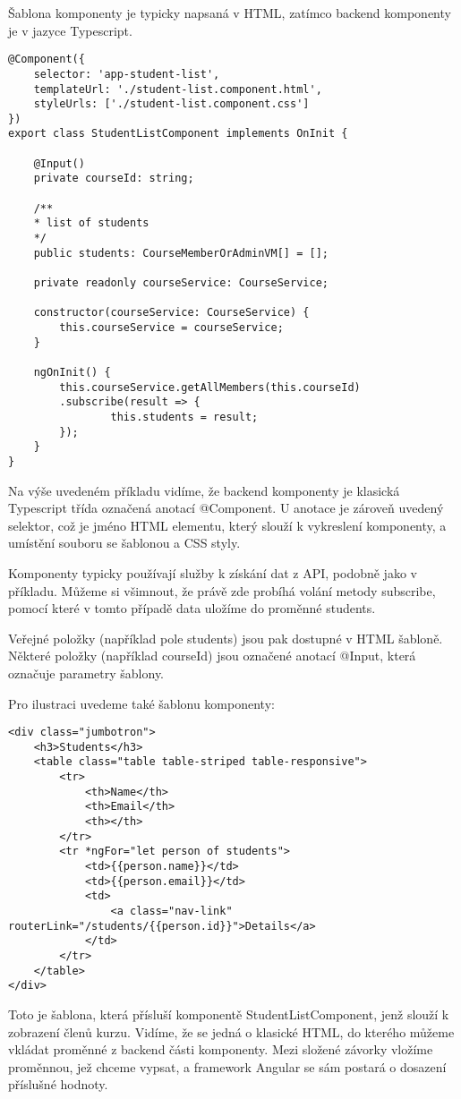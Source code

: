 Šablona komponenty je typicky napsaná v HTML, zatímco backend komponenty je v jazyce Typescript. 

\lstset{style=typescript}
\begin{lstlisting}
@Component({
	selector: 'app-student-list',
	templateUrl: './student-list.component.html',
	styleUrls: ['./student-list.component.css']
})
export class StudentListComponent implements OnInit {

	@Input()
	private courseId: string;
	
	/**
	* list of students
	*/
	public students: CourseMemberOrAdminVM[] = [];
	
	private readonly courseService: CourseService;
	
	constructor(courseService: CourseService) {
		this.courseService = courseService;
	}
	
	ngOnInit() {
		this.courseService.getAllMembers(this.courseId)
		.subscribe(result => {
				this.students = result;
		});
	}
}
\end{lstlisting}

Na výše uvedeném příkladu vidíme, že backend komponenty je klasická Typescript třída označená anotací @Component. U anotace je zároveň uvedený selektor, což je jméno HTML elementu, který slouží k vykreslení komponenty, a umístění souboru se šablonou a CSS styly.

Komponenty typicky používají služby k získání dat z API, podobně jako v příkladu. Můžeme si všimnout, že právě zde probíhá volání metody subscribe, pomocí které v tomto případě data uložíme do proměnné students.

Veřejné položky (například pole students) jsou pak dostupné v HTML šabloně. Některé položky (například courseId) jsou označené anotací @Input, která označuje parametry šablony.

Pro ilustraci uvedeme také šablonu komponenty:

\lstset{style=html}
\begin{lstlisting}
<div class="jumbotron">
	<h3>Students</h3>
	<table class="table table-striped table-responsive">
		<tr>
			<th>Name</th>
			<th>Email</th>
			<th></th>
		</tr>
		<tr *ngFor="let person of students">
			<td>{{person.name}}</td>
			<td>{{person.email}}</td>
			<td>
				<a class="nav-link" routerLink="/students/{{person.id}}">Details</a>
			</td>
		</tr>
	</table>
</div>
\end{lstlisting}

Toto je šablona, která přísluší komponentě StudentListComponent, jenž slouží k zobrazení členů kurzu. Vidíme, že se jedná o klasické HTML, do kterého můžeme vkládat proměnné z backend části komponenty.
Mezi složené závorky vložíme proměnnou, jež chceme vypsat, a framework Angular se sám postará o dosazení příslušné hodnoty.

